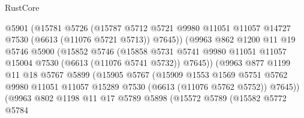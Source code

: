 \begin{lexlean}{RustCore}
\begin{coremodule}
                            @5901
                            (@15781
                              @5726
                              (@15787
                                @5712
                                @5721
                                @9980
                                @11051
                                @11057
                                @14727
                                @7530
                                (@6613 (@11076 @5721 @5713))
                                @7645))
                            (@9963
                              @862
                              @1200
                              @11
                              @19
                              @5746
                              @5900
                              (@15852
                                @5746
                                (@15858
                                  @5731
                                  @5741
                                  @9980
                                  @11051
                                  @11057
                                  @15004
                                  @7530
                                  (@6613 (@11076 @5741 @5732))
                                  @7645))
                              (@9963
                                @877
                                @1199
                                @11
                                @18
                                @5767
                                @5899
                                (@15905
                                  @5767
                                  (@15909
                                    @1553
                                    @1569
                                    @5751
                                    @5762
                                    @9980
                                    @11051
                                    @11057
                                    @15289
                                    @7530
                                    (@6613 (@11076 @5762 @5752))
                                    @7645))
                                (@9963
                                  @802
                                  @1198
                                  @11
                                  @17
                                  @5789
                                  @5898
                                  (@15572
                                    @5789
                                    (@15582
                                      @5772
                                      @5784

\end{coremodule}
\end{lexlean}
